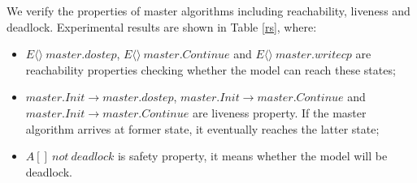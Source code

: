 \begin{figure}[htbp]
\end{figure}


 
We verify the properties of master algorithms including reachability, liveness and deadlock. Experimental results are shown in Table \ref{rs}, where:

\begin{itemize}
\item
$E \langle\rangle ~master.dostep$, $E\langle\rangle~master.Continue$ and $E\langle\rangle~master.writecp$ are reachability properties checking whether the model can reach these states;
\item
$master.Init \rightarrow master.dostep$, $master.Init \rightarrow master.Continue$ and $master.Init \rightarrow master.Continue$ are liveness property. If the master algorithm arrives at former state, it eventually reaches the latter state;
\item
$A[]~not~deadlock$ is safety property, it means whether the model will be deadlock.
\end{itemize}

